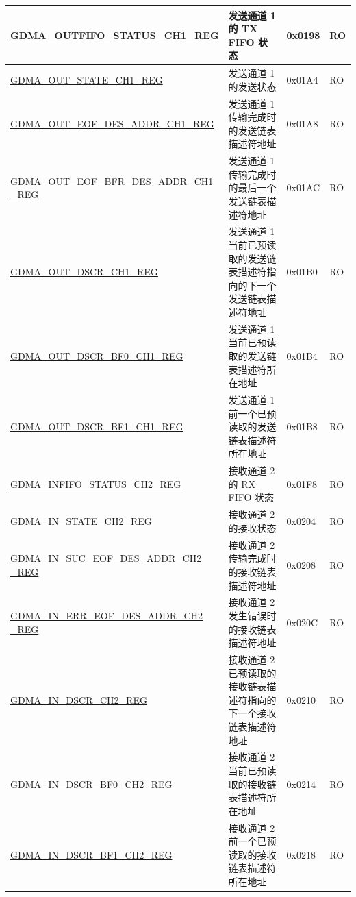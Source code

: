 \begin{longtable}{ | L{6.4cm} | L{6.5cm} | L{1.3cm} | L{1.3cm} | }
\hyperref[regdesc:GDMAOUTFIFOSTATUSCHNREG]{GDMA\_OUTFIFO\_STATUS\_CH1\_REG} & 发送通道 1 的 TX FIFO 状态 & 0x0198 & RO \\ \hline
\hyperref[regdesc:GDMAOUTSTATECHNREG]{GDMA\_OUT\_STATE\_CH1\_REG} & 发送通道 1 的发送状态 & 0x01A4 & RO \\ \hline
\hyperref[regdesc:GDMAOUTEOFDESADDRCHNREG]{GDMA\_OUT\_EOF\_DES\_ADDR\_CH1\_REG} & 发送通道 1 传输完成时的发送链表描述符地址 & 0x01A8 & RO \\ \hline
\hyperref[regdesc:GDMAOUTEOFBFRDESADDRCHNREG]{GDMA\_OUT\_EOF\_BFR\_DES\_ADDR\_CH1\newline\_REG} & 发送通道 1 传输完成时的最后一个发送链表描述符地址 & 0x01AC & RO \\ \hline
\hyperref[regdesc:GDMAOUTDSCRCHNREG]{GDMA\_OUT\_DSCR\_CH1\_REG} & 发送通道 1 当前已预读取的发送链表描述符指向的下一个发送链表描述符地址 & 0x01B0 & RO \\ \hline
\hyperref[regdesc:GDMAOUTDSCRBF0CHNREG]{GDMA\_OUT\_DSCR\_BF0\_CH1\_REG} & 发送通道 1 当前已预读取的发送链表描述符所在地址 & 0x01B4 & RO \\ \hline
\hyperref[regdesc:GDMAOUTDSCRBF1CHNREG]{GDMA\_OUT\_DSCR\_BF1\_CH1\_REG} & 发送通道 1 前一个已预读取的发送链表描述符所在地址 & 0x01B8 & RO \\ \hline
\hyperref[regdesc:GDMAINFIFOSTATUSCHNREG]{GDMA\_INFIFO\_STATUS\_CH2\_REG} & 接收通道 2 的 RX FIFO 状态 & 0x01F8 & RO \\ \hline
\hyperref[regdesc:GDMAINSTATECHNREG]{GDMA\_IN\_STATE\_CH2\_REG} & 接收通道 2 的接收状态 & 0x0204 & RO \\ \hline
\hyperref[regdesc:GDMAINSUCEOFDESADDRCHNREG]{GDMA\_IN\_SUC\_EOF\_DES\_ADDR\_CH2\newline\_REG} & 接收通道 2 传输完成时的接收链表描述符地址 & 0x0208 & RO \\ \hline
\hyperref[regdesc:GDMAINERREOFDESADDRCHNREG]{GDMA\_IN\_ERR\_EOF\_DES\_ADDR\_CH2\newline\_REG} & 接收通道 2 发生错误时的接收链表描述符地址 & 0x020C & RO \\ \hline
\hyperref[regdesc:GDMAINDSCRCHNREG]{GDMA\_IN\_DSCR\_CH2\_REG} & 接收通道 2 已预读取的接收链表描述符指向的下一个接收链表描述符地址 & 0x0210 & RO \\ \hline
\hyperref[regdesc:GDMAINDSCRBF0CHNREG]{GDMA\_IN\_DSCR\_BF0\_CH2\_REG} & 接收通道 2 当前已预读取的接收链表描述符所在地址 & 0x0214 & RO \\ \hline
\hyperref[regdesc:GDMAINDSCRBF1CHNREG]{GDMA\_IN\_DSCR\_BF1\_CH2\_REG} & 接收通道 2 前一个已预读取的接收链表描述符所在地址 & 0x0218 & RO \\ \hline

\end{longtable}
